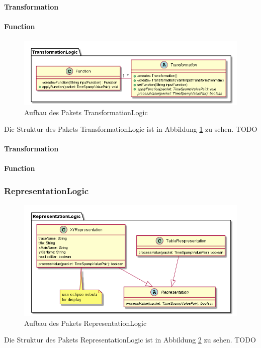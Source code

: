 \documentclass[parskip=full]{scrartcl}
\begin{document}
\paragraph{Transformation}
\paragraph{Function}
\begin{figure}[htbp]
	\begin{center}
		\includegraphics[width = 12cm]{Grafiken/TransformationLogic.png}
		\caption{Aufbau des Pakets TransformationLogic}
		\label{TransformationLogic}
	\end{center}
\end{figure}

Die Struktur des Pakets TransformationLogic ist in Abbildung \ref{TransformationLogic} zu sehen.
TODO
\paragraph{Transformation}
\paragraph{Function}



\subsubsection{RepresentationLogic}
\begin{figure}[htbp]
	\begin{center}
		\includegraphics[width = 12cm]{Grafiken/RepresentationLogic.png}
		\caption{Aufbau des Pakets RepresentationLogic}
		\label{RepresentationLogic}
	\end{center}
\end{figure}
Die Struktur des Pakets RepresentationLogic ist in Abbildung \ref{RepresentationLogic} zu sehen.
TODO
\end{document}
